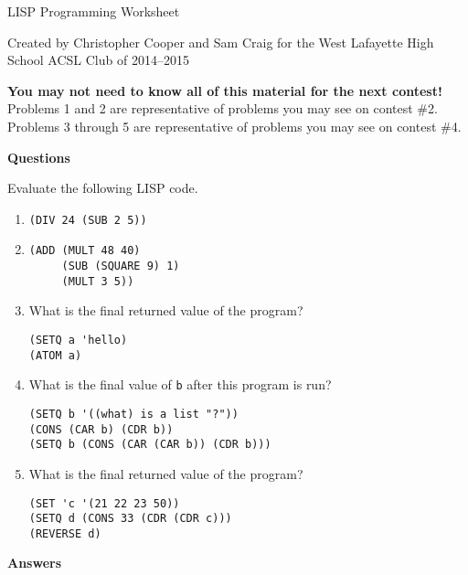 \documentclass[12pt,letterpaper]{article}
\begin{document}
\begin{center}
  LISP Programming Worksheet

  Created by Christopher Cooper and Sam Craig for the West Lafayette High School ACSL Club of 2014--2015
\end{center}

\textbf{You may not need to know all of this material for the next contest!}
Problems 1 and 2 are representative of problems you may see on contest \#2.
Problems 3 through 5 are representative of problems you may see on contest \#4.

\bigskip
\noindent \textbf{Questions}

Evaluate the following LISP code.

\begin{enumerate}

\item
\begin{verbatim}
(DIV 24 (SUB 2 5))
\end{verbatim}

\item
\begin{verbatim}
(ADD (MULT 48 40)
     (SUB (SQUARE 9) 1)
     (MULT 3 5))
\end{verbatim}

\item What is the final returned value of the program? 
\begin{verbatim}
(SETQ a 'hello)
(ATOM a)
\end{verbatim}

\item What is the final value of \texttt{b} after this program is run?
\begin{verbatim}
(SETQ b '((what) is a list "?"))
(CONS (CAR b) (CDR b))
(SETQ b (CONS (CAR (CAR b)) (CDR b)))
\end{verbatim}

\item What is the final returned value of the program?
\begin{verbatim}
(SET 'c '(21 22 23 50))
(SETQ d (CONS 33 (CDR (CDR c)))
(REVERSE d)
\end{verbatim}

\end{enumerate}

\pagebreak

\noindent \textbf{Answers}
\end{document}
